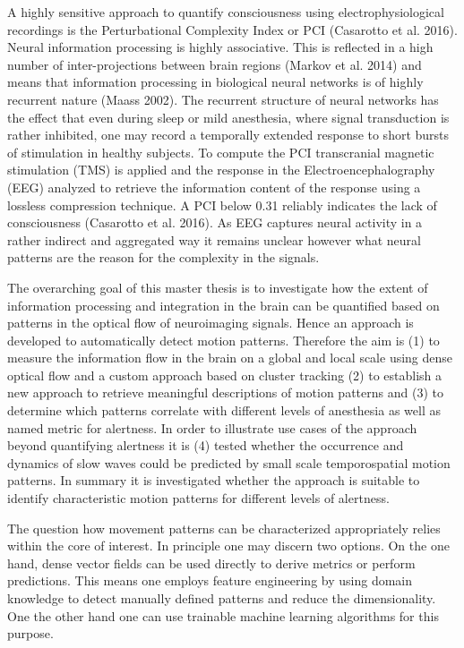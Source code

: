 A highly sensitive approach to quantify consciousness using electrophysiological recordings is the Perturbational Complexity Index or PCI (Casarotto et al. 2016). Neural information processing is highly associative. This is reflected in a high number of inter-projections between brain regions (Markov et al. 2014) and means that information processing in biological neural networks is of highly recurrent nature (Maass 2002). The recurrent structure of neural networks has the effect that even during sleep or mild anesthesia, where signal transduction is rather inhibited, one may record a temporally extended response to short bursts of stimulation in healthy subjects. To compute the PCI transcranial magnetic stimulation (TMS) is applied and the response in the Electroencephalography (EEG) analyzed to retrieve the information content of the response using a lossless compression technique. A PCI below 0.31 reliably indicates the lack of consciousness (Casarotto et al. 2016). As EEG captures neural activity in a rather indirect and aggregated way it remains unclear however what neural patterns are the reason for the complexity in the signals.  

The overarching goal of this master thesis is to investigate how the extent of information processing and integration in the brain can be quantified based on patterns in the optical flow of neuroimaging signals. Hence an approach is developed to automatically detect motion patterns. Therefore the aim is (1) to measure the information flow in the brain on a global and local scale using dense optical flow and a custom approach based on cluster tracking (2) to establish a new approach to retrieve meaningful descriptions of motion patterns and (3) to determine which patterns correlate with different levels of anesthesia as well as named metric for alertness. In order to illustrate use cases of the approach beyond quantifying alertness it is (4) tested whether the occurrence and dynamics of slow waves could be predicted by small scale temporospatial motion patterns. In summary it is investigated whether the approach is suitable to identify characteristic motion patterns for different levels of alertness. 

The question how movement patterns can be characterized appropriately relies within the core of interest. In principle one may discern two options. On the one hand, dense vector fields can be used directly to derive metrics or perform predictions. This means one employs feature engineering by using domain knowledge to detect manually defined patterns and reduce the dimensionality. One the other hand one can use trainable machine learning algorithms for this purpose.

